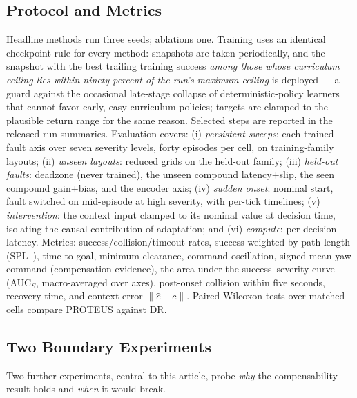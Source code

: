 \documentclass[journal]{IEEEtran}
\newcommand{\ehat}{\hat{c}}
\begin{document}
\subsection{Protocol and Metrics}
Headline methods run three seeds; ablations one. Training uses an identical
checkpoint rule for every method: snapshots are taken periodically, and the
snapshot with the best trailing training success \emph{among those whose
curriculum ceiling lies within ninety percent of the run's maximum ceiling}
is deployed --- a guard against the occasional late-stage collapse of
deterministic-policy learners that cannot favor early, easy-curriculum
policies; targets are clamped to the plausible return range for the same
reason. Selected steps are reported in the released run summaries. Evaluation covers:
(i) \emph{persistent sweeps}: each trained fault axis over seven severity
levels, forty episodes per cell, on training-family layouts; (ii)
\emph{unseen layouts}: reduced grids on the held-out family; (iii)
\emph{held-out faults}: deadzone (never trained), the unseen compound
latency$+$slip, the seen compound gain$+$bias, and the encoder axis;
(iv) \emph{sudden onset}: nominal start, fault switched on mid-episode at
high severity, with per-tick timelines; (v) \emph{intervention}: the context
input clamped to its nominal value at decision time, isolating the causal
contribution of adaptation; and (vi) \emph{compute}: per-decision latency.
Metrics: success/collision/timeout rates, success weighted by path length
(SPL~\cite{Anderson2018SPL}), time-to-goal, minimum clearance, command
oscillation, signed mean yaw command (compensation evidence), the area under
the success--severity curve (AUC$_S$, macro-averaged over axes), post-onset
collision within five seconds, recovery time, and context error
$\lVert\ehat - c\rVert$. Paired Wilcoxon tests over matched cells compare
PROTEUS against DR.

\subsection{Two Boundary Experiments}\label{sec:boundary-design}
Two further experiments, central to this article, probe \emph{why} the
compensability result holds and \emph{when} it would break.
\end{document}
